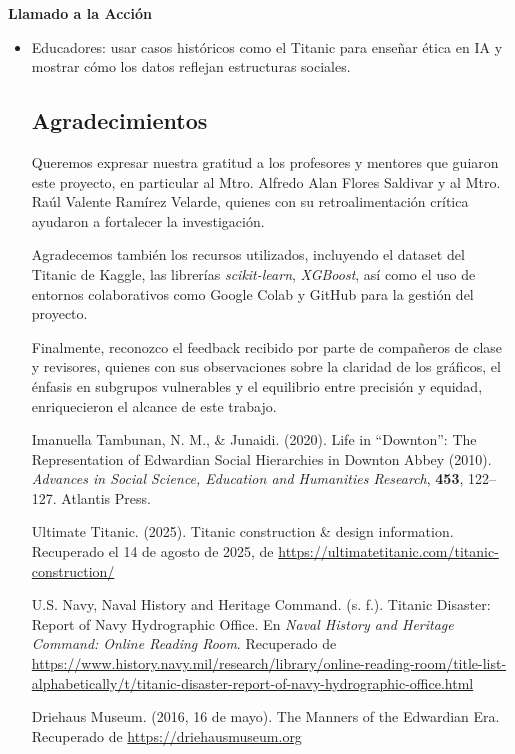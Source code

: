 \documentclass[sjournal]{IEEEtran}
\begin{document}
\textbf{Llamado a la Acción} 
          \begin{itemize}
              \item Educadores: usar casos históricos como el Titanic para enseñar ética en IA y mostrar cómo los datos reflejan estructuras sociales.


\subsection{ Agradecimientos}

Queremos expresar nuestra gratitud a los profesores y mentores que guiaron este proyecto, en particular al Mtro. Alfredo Alan Flores Saldivar y al Mtro. Raúl Valente Ramírez Velarde, quienes con su retroalimentación crítica ayudaron a fortalecer la investigación.

Agradecemos también los recursos utilizados, incluyendo el dataset del Titanic de Kaggle, las librerías \textit{scikit-learn}, \textit{XGBoost}, así como el uso de entornos colaborativos como Google Colab y GitHub para la gestión del proyecto.

Finalmente, reconozco el feedback recibido por parte de compañeros de clase y revisores, quienes con sus observaciones sobre la claridad de los gráficos, el énfasis en subgrupos vulnerables y el equilibrio entre precisión y equidad, enriquecieron el alcance de este trabajo.



\begin{thebibliography}{99}

Imanuella Tambunan, N. M., \& Junaidi. (2020). 
Life in “Downton”: The Representation of Edwardian Social Hierarchies in Downton Abbey (2010). 
\textit{Advances in Social Science, Education and Humanities Research}, \textbf{453}, 122–127. Atlantis Press.

Ultimate Titanic. (2025). 
Titanic construction \& design information. 
Recuperado el 14 de agosto de 2025, de \url{https://ultimatetitanic.com/titanic-construction/}

U.S. Navy, Naval History and Heritage Command. (s. f.). 
Titanic Disaster: Report of Navy Hydrographic Office. 
En \textit{Naval History and Heritage Command: Online Reading Room}. 
Recuperado de \url{https://www.history.navy.mil/research/library/online-reading-room/title-list-alphabetically/t/titanic-disaster-report-of-navy-hydrographic-office.html}

Driehaus Museum. (2016, 16 de mayo). 
The Manners of the Edwardian Era. 
Recuperado de \url{https://driehausmuseum.org}


\end{thebibliography}
\end{itemize}
\end{document}
